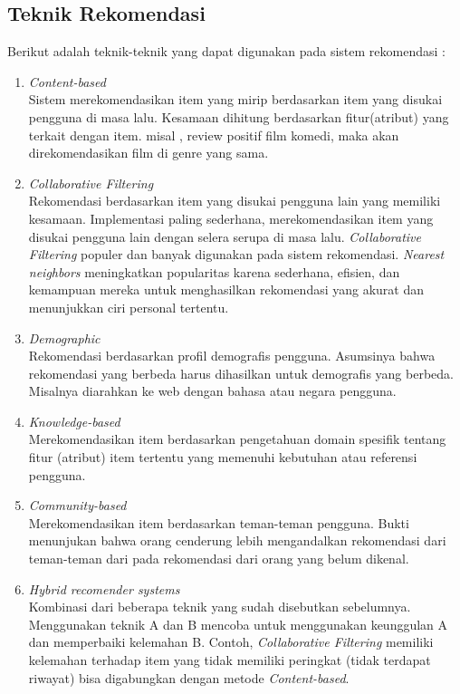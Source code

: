 \subsection{Teknik Rekomendasi}
\label{teknik rekomendasi}
Berikut adalah teknik-teknik yang dapat digunakan pada sistem rekomendasi : \\%
\begin{enumerate}
	\item \textit{Content-based}\\
		Sistem merekomendasikan item yang mirip berdasarkan item yang disukai pengguna di masa lalu. Kesamaan dihitung berdasarkan fitur(atribut) yang terkait dengan item. misal , review positif film komedi, maka akan direkomendasikan film di genre yang sama. 

	\item \textit{Collaborative Filtering} \\
		 Rekomendasi berdasarkan item yang disukai pengguna lain yang memiliki kesamaan. Implementasi paling sederhana, merekomendasikan item yang disukai pengguna lain dengan selera serupa di masa lalu.  \textit{Collaborative Filtering} populer dan banyak digunakan pada sistem rekomendasi. \textit{Nearest neighbors} meningkatkan popularitas karena sederhana, efisien, dan kemampuan mereka untuk menghasilkan rekomendasi yang akurat dan menunjukkan ciri personal tertentu.
	
	\item \textit{Demographic} \\
		Rekomendasi berdasarkan profil demografis pengguna. Asumsinya bahwa rekomendasi yang berbeda harus dihasilkan untuk demografis yang berbeda. Misalnya diarahkan ke web dengan bahasa atau negara pengguna. 

	\item \textit{Knowledge-based} \\
		Merekomendasikan item berdasarkan pengetahuan domain spesifik tentang fitur (atribut) item tertentu yang memenuhi kebutuhan atau referensi pengguna. 

	\item \textit{Community-based} \\
		Merekomendasikan item berdasarkan teman-teman pengguna. Bukti menunjukan bahwa orang cenderung lebih mengandalkan rekomendasi dari teman-teman dari pada rekomendasi dari orang yang belum dikenal. 

	\item \textit{Hybrid recomender systems} \\
		Kombinasi dari beberapa teknik yang sudah disebutkan sebelumnya. Menggunakan teknik A dan B mencoba untuk menggunakan keunggulan A dan memperbaiki kelemahan B. Contoh, \textit{Collaborative Filtering} memiliki kelemahan terhadap item yang tidak memiliki peringkat (tidak terdapat riwayat) bisa digabungkan dengan metode \textit{Content-based}.
\end{enumerate}


